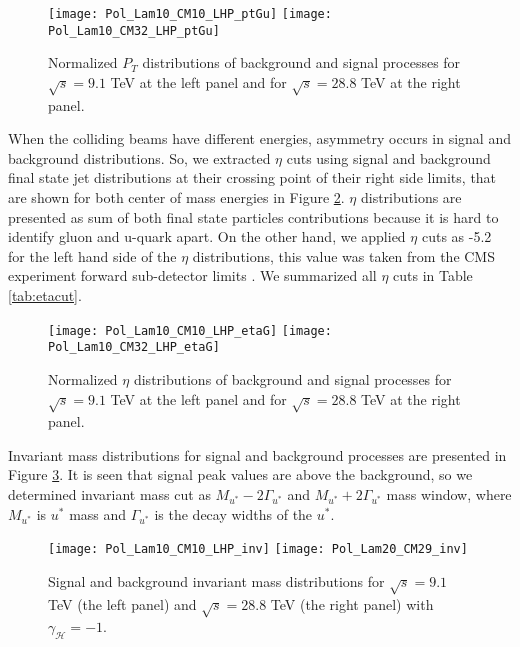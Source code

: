 \documentclass{appolb}
\begin{document}
\begin{figure}[h!]
	\centering
	\texttt{[image: Pol\_Lam10\_CM10\_LHP\_ptGu]}%
	\texttt{[image: Pol\_Lam10\_CM32\_LHP\_ptGu]}%
	\caption{\label{fig:CM1032Pt} Normalized $P_T$ distributions of background and signal processes for  $\sqrt{s} = 9.1$ TeV  at the left  panel and  for $\sqrt{s} = 28.8$ TeV at the right panel.}
\end{figure}

When the colliding beams have different energies,  asymmetry occurs in signal and background distributions. So, we  extracted  $\eta$ cuts using  signal and  background final state jet distributions at their crossing point of their right side limits, that are shown for both center of mass energies in Figure \ref{fig:CM10eta}. $\eta$ distributions are presented as sum of both final state particles contributions because it is hard to identify gluon and u-quark apart.  On the other hand, we applied $\eta$ cuts as -5.2 for the left hand side of the $\eta$ distributions, this value was taken from the CMS experiment forward sub-detector limits \cite{cms2015}. We summarized all $\eta$ cuts in Table \ref{tab:etacut}.

\begin{figure}[h!]
	\centering
	\texttt{[image: Pol\_Lam10\_CM10\_LHP\_etaG]}%
	\texttt{[image: Pol\_Lam10\_CM32\_LHP\_etaG]}%
	\caption{\label{fig:CM10eta} Normalized  $\eta$ distributions of background and signal processes for $\sqrt{s} = 9.1$ TeV at the left panel and for $\sqrt{s} = 28.8$ TeV at the right panel.}
\end{figure}

Invariant mass distributions for signal and background  processes are presented in Figure \ref{fig:CM1032inv}. It is seen that  signal peak values are above the background, so we determined invariant mass cut as $M_{u^*}-2\Gamma_{u^*}$ and $M_{u^*}+2\Gamma_{u^*}$ mass window, where  $M_{u^*}$ is  $u^*$ mass and $\Gamma_{u^*}$ is the decay widths of the $u^*$. 

\begin{figure}[h!]
	\centering
	\texttt{[image: Pol\_Lam10\_CM10\_LHP\_inv]}%
	\texttt{[image: Pol\_Lam20\_CM29\_inv]}%
	\caption{\label{fig:CM1032inv} Signal and background  invariant mass distributions for  $\sqrt{s} = 9.1$ TeV (the left panel) and $\sqrt{s} = 28.8$ TeV (the right panel) with $\gamma_{\mathcal{H}}= -1$.}
\end{figure}
\end{document}
